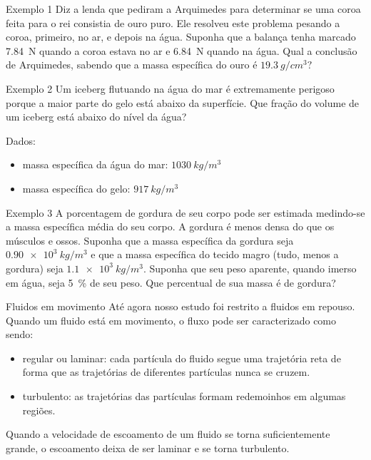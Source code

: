 \begin{frame}{Exemplo 1}
Diz a lenda que pediram a Arquimedes para determinar se uma coroa feita para o
rei consistia de ouro puro. Ele resolveu este problema pesando a coroa,
primeiro, no ar, e depois na água. Suponha que a balança tenha marcado
\SI{7.84}{N} quando a coroa estava no ar e \SI{6.84}{N} quando na água. Qual a
conclusão de Arquimedes, sabendo que a massa específica do ouro é
$\SI{19.3}{g/cm^3}?$
\end{frame}

\begin{frame}{Exemplo 2}
Um iceberg flutuando na água do mar é extremamente perigoso porque a maior
parte do gelo está abaixo da superfície. Que fração do volume de um iceberg
está abaixo do nível da água?

Dados:
\begin{itemize}
\item massa específica da água do mar: $\SI{1030}{kg/m^3}$
\item massa específica do gelo: $\SI{917}{kg/m^3}$
\end{itemize}

\end{frame}

\begin{frame}{Exemplo 3}
A porcentagem de gordura de seu corpo pode ser estimada medindo-se a massa
específica média do seu corpo. A gordura é menos densa do que os músculos e
ossos. Suponha que a massa específica da gordura seja $\SI{0.90e3}{kg/m^3}$ e
que a massa específica do tecido magro (tudo, menos a gordura) seja
$\SI{1.1e3}{kg/m^3}$. Suponha que seu peso aparente, quando imerso em água,
seja \SI{5}{\%} de seu peso. Que percentual de sua massa é de gordura?
\end{frame}

\begin{frame}{Fluidos em movimento}
Até agora nosso estudo foi restrito a fluidos em repouso. Quando um fluido está
em movimento, o fluxo pode ser caracterizado como sendo:
\begin{itemize}
\item regular ou laminar: cada partícula do fluido segue uma trajetória reta de
    forma que as trajetórias de diferentes partículas nunca se cruzem.
\item turbulento: as trajetórias das partículas formam redemoinhos em algumas
    regiões.
\end{itemize}

Quando a velocidade de escoamento de um fluido se torna suficientemente grande,
o escoamento deixa de ser laminar e se torna turbulento.

\end{frame}

